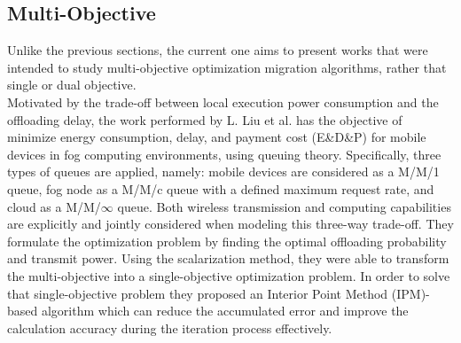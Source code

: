 \subsection{Multi-Objective}\label{sec:multi}
Unlike the previous sections, the current one aims to present works that were intended to study multi-objective optimization migration algorithms, rather that single or dual objective.\\
\noindent\tab Motivated by the trade-off between local execution power consumption and the offloading delay, the work performed by L. Liu et al. \cite{liu2018multiobjective} has the objective of minimize energy consumption, delay, and payment cost (E\&D\&P) for mobile devices in fog computing environments, using queuing theory. Specifically, three types of queues are applied, namely: mobile devices are considered as a M/M/1 queue, fog node as a M/M/c queue with a defined maximum request rate, and cloud as a M/M/$\infty$ queue. Both wireless transmission and computing capabilities are explicitly and jointly considered when modeling this three-way trade-off. They formulate the optimization problem by finding the optimal offloading probability and transmit power. Using the scalarization method, they were able to transform the multi-objective into a single-objective optimization problem. In order to solve that single-objective problem they proposed an Interior Point Method (IPM)-based algorithm which can reduce the accumulated error and improve the calculation accuracy during the iteration process effectively.\\
